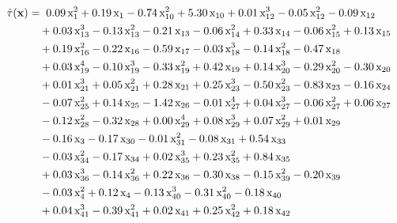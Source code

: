 \begin{samepage}
\begin{align*}
\hcate{\covariates}
&= \; 0.09\,\covariate_{1}^{2} + 0.19\,\covariate_{1}
- 0.74\,\covariate_{10}^{2} + 5.30\,\covariate_{10}
+ 0.01\,\covariate_{12}^{3} - 0.05\,\covariate_{12}^{2} - 0.09\,\covariate_{12} \\
&\quad + 0.03\,\covariate_{13}^{3} - 0.13\,\covariate_{13}^{2} - 0.21\,\covariate_{13}
- 0.06\,\covariate_{14}^{2} + 0.33\,\covariate_{14}
- 0.06\,\covariate_{15}^{2} + 0.13\,\covariate_{15} \\
&\quad + 0.19\,\covariate_{16}^{2} - 0.22\,\covariate_{16}
- 0.59\,\covariate_{17}
- 0.03\,\covariate_{18}^{3} - 0.14\,\covariate_{18}^{2} - 0.47\,\covariate_{18} \\
&\quad + 0.03\,\covariate_{19}^{4} - 0.10\,\covariate_{19}^{3} - 0.33\,\covariate_{19}^{2} + 0.42\,\covariate_{19}
+ 0.14\,\covariate_{20}^{3} - 0.29\,\covariate_{20}^{2} - 0.30\,\covariate_{20} \\
&\quad + 0.01\,\covariate_{21}^{3} + 0.05\,\covariate_{21}^{2} + 0.28\,\covariate_{21}
+ 0.25\,\covariate_{23}^{3} - 0.50\,\covariate_{23}^{2} - 0.83\,\covariate_{23}
- 0.16\,\covariate_{24} \\
&\quad - 0.07\,\covariate_{25}^{2} + 0.14\,\covariate_{25}
- 1.42\,\covariate_{26}
- 0.01\,\covariate_{27}^{4} + 0.04\,\covariate_{27}^{3} - 0.06\,\covariate_{27}^{2} + 0.06\,\covariate_{27} \\
&\quad - 0.12\,\covariate_{28}^{2} - 0.32\,\covariate_{28}
+ 0.00\,\covariate_{29}^{4} + 0.08\,\covariate_{29}^{3} + 0.07\,\covariate_{29}^{2} + 0.01\,\covariate_{29} \\
&\quad - 0.16\,\covariate_{3}
- 0.17\,\covariate_{30}
- 0.01\,\covariate_{31}^{2} - 0.08\,\covariate_{31}
+ 0.54\,\covariate_{33} \\
&\quad - 0.03\,\covariate_{34}^{2} - 0.17\,\covariate_{34}
+ 0.02\,\covariate_{35}^{3} + 0.23\,\covariate_{35}^{2} + 0.84\,\covariate_{35} \\
&\quad + 0.03\,\covariate_{36}^{3} - 0.14\,\covariate_{36}^{2} + 0.22\,\covariate_{36}
- 0.30\,\covariate_{38}
- 0.15\,\covariate_{39}^{2} - 0.20\,\covariate_{39} \\
&\quad - 0.03\,\covariate_{4}^{2} + 0.12\,\covariate_{4}
- 0.13\,\covariate_{40}^{3} - 0.31\,\covariate_{40}^{2} - 0.18\,\covariate_{40} \\
&\quad + 0.04\,\covariate_{41}^{3} - 0.39\,\covariate_{41}^{2} + 0.02\,\covariate_{41}
+ 0.25\,\covariate_{42}^{2} + 0.18\,\covariate_{42} \\

\end{align*}
\end{samepage}
